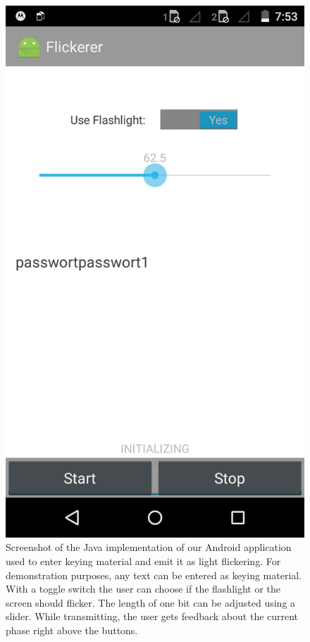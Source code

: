 \documentclass{sig-alternate} %
\begin{document}
\begin{figure}
	\centering
	\includegraphics[scale=.15]{images/screen_native.png}
	\caption{Screenshot of the Java implementation of our Android application used to enter keying material and emit it as light flickering. For demonstration purposes, any text can be entered as keying material. With a toggle switch the user can choose if the flashlight or the screen should flicker. The length of one bit can be adjusted using a slider. While transmitting, the user gets feedback about the current phase right above the buttons.}
	\label{fig:screenshot}
\end{figure}
\end{document}
